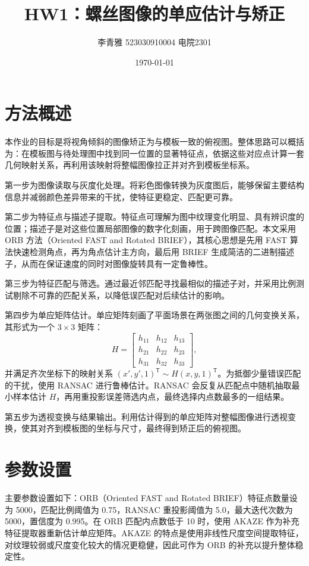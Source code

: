 \documentclass{article}
\title{HW1：螺丝图像的单应估计与矫正}
\author{李青雅 523030910004 电院2301}
\date{\today} %
\begin{document}
\maketitle
\newpage
\tableofcontents %
\newpage

\section{方法概述}
本作业的目标是将视角倾斜的图像矫正为与模板一致的俯视图。整体思路可以概括为：在模板图与待处理图中找到同一位置的显著特征点，依据这些对应点计算一套几何映射关系，再利用该映射将整幅图像拉正并对齐到模板坐标系。

第一步为图像读取与灰度化处理。将彩色图像转换为灰度图后，能够保留主要结构信息并减弱颜色差异带来的干扰，使特征更稳定、匹配更可靠。

第二步为特征点与描述子提取。特征点可理解为图中纹理变化明显、具有辨识度的位置；描述子是对这些位置局部图像的数字化刻画，用于跨图像匹配。本文采用 ORB 方法（Oriented FAST and Rotated BRIEF），其核心思想是先用 FAST 算法快速检测角点，再为角点估计主方向，最后用 BRIEF 生成简洁的二进制描述子，从而在保证速度的同时对图像旋转具有一定鲁棒性。

第三步为特征匹配与筛选。通过最近邻匹配寻找最相似的描述子对，并采用比例测试剔除不可靠的匹配关系，以降低误匹配对后续估计的影响。

第四步为单应矩阵估计。单应矩阵刻画了平面场景在两张图之间的几何变换关系，其形式为一个 $3\times3$ 矩阵：
\begin{equation}
H=
\begin{bmatrix}
h_{11} & h_{12} & h_{13} \\
h_{21} & h_{22} & h_{23} \\
h_{31} & h_{32} & h_{33}
\end{bmatrix},
\end{equation}
并满足齐次坐标下的映射关系 $(x',y',1)^\mathsf{T} \sim H(x,y,1)^\mathsf{T}$。为抵御少量错误匹配的干扰，使用 RANSAC 进行鲁棒估计。RANSAC 会反复从匹配点中随机抽取最小样本估计 $H$，再用重投影误差筛选内点，最终选择内点数最多的一组结果。

第五步为透视变换与结果输出。利用估计得到的单应矩阵对整幅图像进行透视变换，使其对齐到模板图的坐标与尺寸，最终得到矫正后的俯视图。

\section{参数设置}
主要参数设置如下：ORB（Oriented FAST and Rotated BRIEF）特征点数量设为 5000，匹配比例阈值为 0.75，RANSAC 重投影阈值为 5.0，最大迭代次数为 5000，置信度为 0.995。在 ORB 匹配内点数低于 10 时，使用 AKAZE 作为补充特征提取器重新估计单应矩阵。AKAZE 的特点是使用非线性尺度空间提取特征，对纹理较弱或尺度变化较大的情况更稳健，因此可作为 ORB 的补充以提升整体稳定性。
\end{document}

